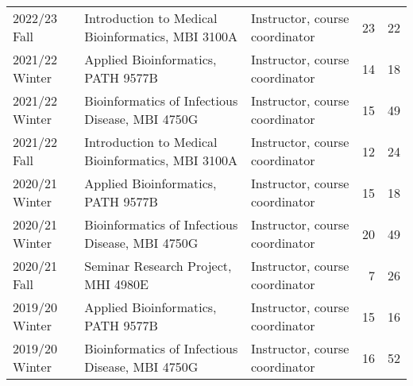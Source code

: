 \begin{tabular}{lp{2.35in}p{1.2in}rr}
2022/23 Fall & Introduction to Medical Bioinformatics, MBI 3100A & Instructor, course coordinator & 23 & 22\\


2021/22 Winter & Applied Bioinformatics, PATH 9577B & Instructor, course coordinator & 14 & 18\\
2021/22 Winter & Bioinformatics of Infectious Disease, MBI 4750G & Instructor, course coordinator & 15 & 49\\
2021/22 Fall & Introduction to Medical Bioinformatics, MBI 3100A & Instructor, course coordinator & 12 & 24\\

2020/21 Winter & Applied Bioinformatics, PATH 9577B & Instructor, course coordinator & 15 & 18\\
2020/21 Winter & Bioinformatics of Infectious Disease, MBI 4750G & Instructor, course coordinator & 20 & 49\\





 


2020/21 Fall & Seminar Research Project, MHI 4980E & Instructor, course coordinator & 7 & 26\\


2019/20 Winter & Applied Bioinformatics, PATH 9577B & Instructor, course coordinator & 15 & 16\\
2019/20 Winter & Bioinformatics of Infectious Disease, MBI 4750G & Instructor, course coordinator & 16 & 52\\

\hline

\end{tabular}
\egroup